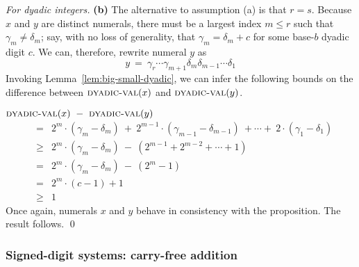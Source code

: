 \begin{proof}[For dyadic integers]
{\bf (b)} The alternative to assumption (a) is that $r = s$.  Because
$x$ and $y$ are distinct numerals, there must be a largest index $m
\leq r$ such that $\gamma_m \neq \delta_m$; say, with no loss of
generality, that $\gamma_m = \delta_m + c$ for some base-$b$ dyadic
digit $c$.  We can, therefore, rewrite numeral $y$ as
\[ y \ = \ \gamma_r \cdots \gamma_{m+1} \delta_m \delta_{m-1} \cdots \delta_1
\]
Invoking Lemma~\ref{lem:big-small-dyadic}, we can infer the following
bounds on the difference between $\mbox{\sc dyadic-val}(x)$ and
$\mbox{\sc dyadic-val}(y)$.

\bigskip

$\mbox{\sc dyadic-val}(x) \ - \ \mbox{\sc dyadic-val}(y)$
\begin{eqnarray*}
  & =  &
2^m \cdot (\gamma_m - \delta_m) \ + \ 2^{m-1} \cdot (\gamma_{m-1} -
\delta_{m-1}) \ + \cdots + \  2 \cdot (\gamma_1 - \delta_1) \\
  & \geq &
2^m \cdot (\gamma_m - \delta_m) \ - \ \left( 2^{m-1} + 2^{m-2} +
\cdots + 1 \right) \\
  & = &
2^m \cdot (\gamma_m - \delta_m)\ - \ \left( 2^m -1 \right) \\
  & = &
2^m \cdot (c-1) +1 \\
  & \geq & 1
\end{eqnarray*}
Once again, numerals $x$ and $y$ behave in consistency with the
proposition.  The result follows.
\qed
\end{proof}


\subsubsection{Signed-digit systems: carry-free addition}
\label{sec:carry-free}

